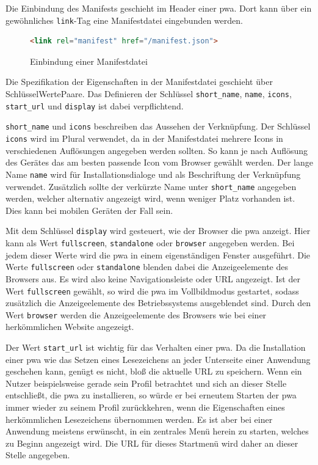 \documentclass[12pt, parskip=half]{scrartcl}       %
\begin{document}
Die Einbindung des Manifests geschieht im Header einer \ac{pwa}.
Dort kann über ein gewöhnliches \texttt{link}-Tag eine Manifestdatei eingebunden werden.

\begin{figure}[h]
\begin{lstlisting}[language=HTML]
                <link rel="manifest" href="/manifest.json">
\end{lstlisting}
\caption{Einbindung einer Manifestdatei}
\label{fig:html_linkmanifest}
\end{figure}

Die Spezifikation der Eigenschaften in der Manifestdatei geschieht über Schlüssel\-Werte\-Paare.
Das Definieren der Schlüssel \texttt{short\_name}, \texttt{name}, \texttt{icons}, \texttt{start\_url} und \texttt{display} ist dabei verpflichtend.

\texttt{short\_name} und \texttt{icons} beschreiben das Aussehen der Verknüpfung.
Der Schlüssel \texttt{icons} wird im Plural verwendet, da in der Manifestdatei mehrere Icons in verschiedenen Auflösungen angegeben werden sollten.
So kann je nach Auflösung des Gerätes das am besten passende Icon vom Browser gewählt werden.
Der lange Name \texttt{name} wird für Installationsdialoge und als Beschriftung der Verknüpfung verwendet.
Zusätzlich sollte der verkürzte Name unter \texttt{short\_name} angegeben werden, welcher alternativ angezeigt wird, wenn weniger Platz vorhanden ist\cite{chromedevs_manifestname}.
Dies kann bei mobilen Geräten der Fall sein.

Mit dem Schlüssel \texttt{display} wird gesteuert, wie der Browser die \ac{pwa} anzeigt.
Hier kann als Wert \texttt{fullscreen}, \texttt{standalone} oder \texttt{browser} angegeben werden.
Bei jedem dieser Werte wird die \ac{pwa} in einem eigenständigen Fenster ausgeführt.
Die Werte \texttt{fullscreen} oder \texttt{standalone} blenden dabei die Anzeigeelemente des Browsers aus.
Es wird also keine Navigationsleiste oder URL angezeigt.
Ist der Wert \texttt{fullscreen} gewählt, so wird die \ac{pwa} im Vollbildmodus gestartet, sodass zusätzlich die Anzeigeelemente des Betriebssystems ausgeblendet sind.
Durch den Wert \texttt{browser} werden die Anzeigeelemente des Browsers wie bei einer herkömmlichen Website angezeigt\cite{googledev_manifest}.

Der Wert \texttt{start\_url} ist wichtig für das Verhalten einer \ac{pwa}.
Da die Installation einer \ac{pwa} wie das Setzen eines Lesezeichens an jeder Unterseite einer Anwendung geschehen kann, genügt es nicht, bloß die aktuelle URL zu speichern.
Wenn ein Nutzer beispielsweise gerade sein Profil betrachtet und sich an dieser Stelle entschließt, die \ac{pwa} zu installieren, so würde er bei erneutem Starten der \ac{pwa} immer wieder zu seinem Profil zurückkehren, wenn die Eigenschaften eines herkömmlichen Lesezeichens übernommen werden.
Es ist aber bei einer Anwendung meistens erwünscht, in ein zentrales Menü herein zu starten, welches zu Beginn angezeigt wird.
Die URL für dieses Startmenü wird daher an dieser Stelle angegeben.
\end{document}
